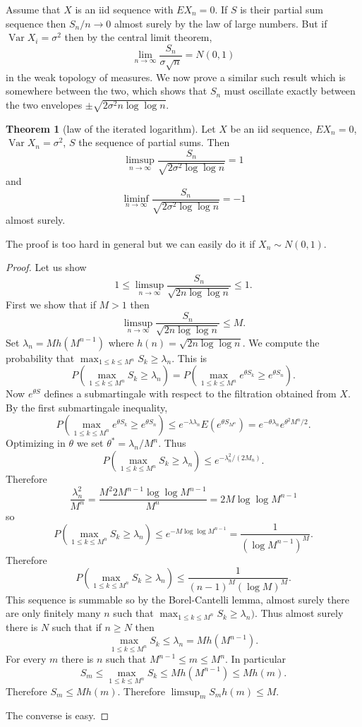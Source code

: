 \documentclass[12pt]{book}
\DeclareMathOperator{\Var}{Var}
\theoremstyle{definition}
\newtheorem{theorem}{Theorem}[chapter]
\begin{document}
Assume that $X$ is an iid sequence with $EX_n = 0$.
If $S$ is their partial sum sequence then $S_n/n \to 0$ almost surely by the law of large numbers.
But if $\Var X_i = \sigma^2$ then by the central limit theorem,
$$\lim_{n \to \infty} \frac{S_n}{\sigma \sqrt n} = N(0, 1)$$
in the weak topology of measures.
We now prove a similar such result which is somewhere between the two, which shows that $S_n$ must oscillate exactly between the two envelopes $\pm \sqrt{2\sigma^2 n \log \log n}$.

\begin{theorem}[law of the iterated logarithm]
Let $X$ be an iid sequence, $EX_n = 0$, $\Var X_n = \sigma^2$, $S$ the sequence of partial sums. Then
$$\limsup_{n \to \infty} \frac{S_n}{\sqrt{2\sigma^2 \log \log n}} = 1$$
and
$$\liminf_{n \to \infty} \frac{S_n}{\sqrt{2\sigma^2 \log \log n}} = -1$$
almost surely.
\end{theorem}
The proof is too hard in general but we can easily do it if $X_n \sim N(0, 1)$.
\begin{proof}
Let us show
$$1 \leq \limsup_{n \to \infty} \frac{S_n}{\sqrt{2n \log \log n}} \leq 1.$$
First we show that if $M > 1$ then
$$\limsup_{n \to \infty} \frac{S_n}{\sqrt{2n \log \log n}} \leq M.$$
Set $\lambda_n = Mh(M^{n-1})$ where $h(n) = \sqrt{2n \log \log n}$.
We compute the probability that $\max_{1 \leq k \leq M^n} S_k \geq \lambda_n$.
This is
$$P(\max_{1 \leq k \leq M^n} S_k \geq \lambda_n) = P(\max_{1 \leq k \leq M^n} e^{\theta S_k} \geq e^{\theta S_n}).$$
Now $e^{\theta S}$ defines a submartingale with respect to the filtration obtained from $X$.
By the first submartingale inequality,
$$P(\max_{1 \leq k \leq M^n} e^{\theta S_k} \geq e^{\theta S_n}) \leq e^{-\lambda \lambda_n} E(e^{\theta S_{M^n}}) = e^{-\theta \lambda_n} e^{\theta^2 M^n/2}.$$
Optimizing in $\theta$ we set $\theta^* = \lambda_n/M^n$.
Thus
$$P(\max_{1 \leq k \leq M^n} S_k \geq \lambda_n) \leq e^{-\lambda_n^2/(2M_n)}.$$
Therefore
$$\frac{\lambda_n^2}{M^n} = \frac{M^2 2M^{n-1} \log \log M^{n-1}}{M^n} = 2M \log \log M^{n-1}$$
so
$$P(\max_{1 \leq k \leq M^n} S_k \geq \lambda_n) \leq e^{-M \log \log M^{n-1}} = \frac{1}{(\log M^{n-1})^M}.$$
Therefore
$$P(\max_{1 \leq k \leq M^n} S_k \geq \lambda_n) \leq \frac{1}{(n - 1)^M (\log M)^M}.$$
This sequence is summable so by the Borel-Cantelli lemma, almost surely there are only finitely many $n$ such that $\max_{1 \leq k \leq M^n} S_k \geq \lambda_n)$.
Thus almost surely there is $N$ such that if $n \geq N$ then
$$\max_{1 \leq k \leq M^n} S_k \leq \lambda_n = Mh(M^{n-1}).$$
For every $m$ there is $n$ such that $M^{n-1} \leq m \leq M^n$.
In particular
$$S_m \leq \max_{1 \leq k \leq M^n} S_k \leq Mh(M^{n-1}) \leq Mh(m).$$
Therefore $S_m \leq Mh(m)$.
Therefore $\limsup_m S_m h(m) \leq M$.

The converse is easy.
\end{proof}
\end{document}
